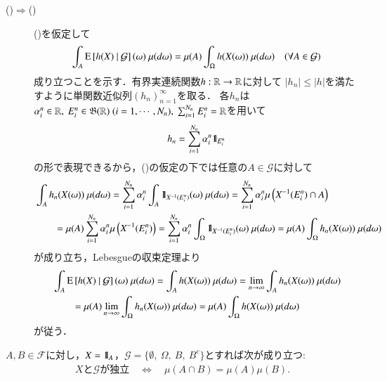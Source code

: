 \begin{prf}
\begin{description}
			\item[()$\Rightarrow$()]
				()を仮定して
				\begin{align}
					\int_A \cexp{h(X)}{\mathcal{G}}(\omega)\ \mu(d\omega) 
					= \mu(A) \int_\Omega h(X(\omega))\ \mu(d\omega)
					\quad (\forall A \in \mathcal{G})
				\end{align}
				成り立つことを示す．有界実連続関数$h:\mathbb{R} \rightarrow \mathbb{R}$に対して
				$|h_n| \leq |h|$を満たすように単関数近似列$(h_n)_{n=1}^{\infty}$を取る．
				各$h_n$は$\alpha_i^n \in \R,\ E_i^n \in \borel{\R}\ (i=1,\cdots,N_n),\ \sum_{i=1}^{N_n}E_i^n = \R$を用いて
				\begin{align}
					h_n = \sum_{i=1}^{N_n} \alpha_i^n \mbox{1}\hspace{-0.25em}\mbox{l}_{E_i^n}
				\end{align}
				の形で表現できるから，()の仮定の下では任意の$A \in \mathcal{G}$に対して
				\begin{align}
					&\int_A h_n(X(\omega))\ \mu(d\omega)
					= \sum_{i=1}^{N_n} \alpha_i^n \int_A \mbox{1}\hspace{-0.25em}\mbox{l}_{X^{-1}(E_i^n)}(\omega)\ \mu(d\omega)
					= \sum_{i=1}^{N_n} \alpha_i^n \mu\left( X^{-1}(E_i^n) \cap A \right) \\
					&\qquad = \mu(A) \sum_{i=1}^{N_n} \alpha_i^n \mu\left( X^{-1}(E_i^n) \right)
					= \sum_{i=1}^{N_n} \alpha_i^n \int_\Omega \mbox{1}\hspace{-0.25em}\mbox{l}_{X^{-1}(E_i^n)}(\omega)\ \mu(d\omega)
					= \mu(A) \int_\Omega h_n(X(\omega))\ \mu(d\omega)
				\end{align}
				が成り立ち，Lebesgueの収束定理より
				\begin{align}
					&\int_A \cexp{h(X)}{\mathcal{G}}(\omega)\ \mu(d\omega)
					= \int_A h(X(\omega))\ \mu(d\omega)
					= \lim_{n \to \infty} \int_A h_n(X(\omega))\ \mu(d\omega) \\
					&\qquad = \mu(A) \lim_{n \to \infty} \int_{\Omega} h_n(X(\omega))\ \mu(d\omega)
					= \mu(A) \int_{\Omega} h(X(\omega))\ \mu(d\omega)
				\end{align}
				が従う．
				\QED
		\end{description}
	\end{prf}
	
	\begin{screen}
		\begin{thm}
			$A,B \in \mathcal{F}$に対し，$X = \mbox{1}\hspace{-0.25em}\mbox{l}_A$，$\mathcal{G} = \{ \emptyset,\ \Omega,\ B,\ B^c\}$とすれば次が成り立つ:
			\begin{align}
				\mbox{$X$と$\mathcal{G}$が独立}\quad \Leftrightarrow\quad \mu(A \cap B) = \mu(A)\mu(B).
			\end{align}
			\label{thm:report_3}
		\end{thm}
	\end{screen}
	

